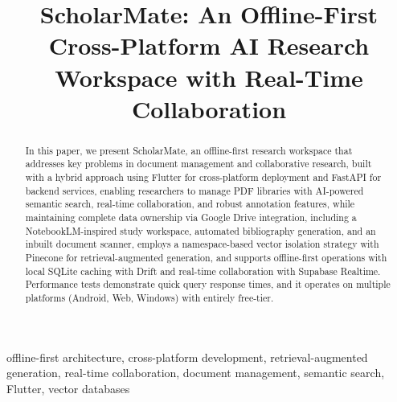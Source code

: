 \documentclass[conference]{IEEEtran}
\begin{document}
\title{ScholarMate: An Offline-First Cross-Platform AI Research Workspace with Real-Time Collaboration}

\author{
}

\maketitle

\begin{abstract}
In this paper, we present ScholarMate, an offline-first research workspace that addresses key problems in document management and collaborative research, built with a hybrid approach using Flutter for cross-platform deployment and FastAPI for backend services, enabling researchers to manage PDF libraries with AI-powered semantic search, real-time collaboration, and robust annotation features, while maintaining complete data ownership via Google Drive integration, including a NotebookLM-inspired study workspace, automated bibliography generation, and an inbuilt document scanner, employs a namespace-based vector isolation strategy with Pinecone for retrieval-augmented generation, and supports offline-first operations with local SQLite caching with Drift and real-time collaboration with Supabase Realtime. Performance tests demonstrate quick query response times, and it operates on multiple platforms (Android, Web, Windows) with entirely free-tier.
\end{abstract}

\begin{IEEEkeywords}
offline-first architecture, cross-platform development, retrieval-augmented generation, real-time collaboration, document management, semantic search, Flutter, vector databases
\end{IEEEkeywords}
\end{document}

